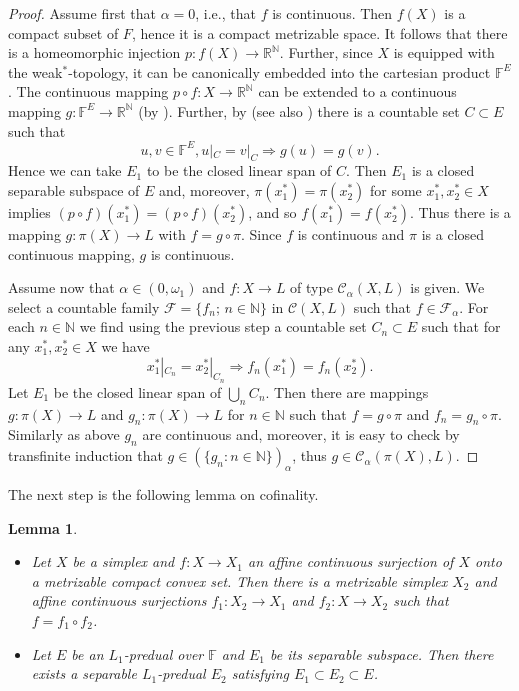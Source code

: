 \documentclass{amsart}
\numberwithin{equation}{section}
\newtheorem{lemma}[thm]{Lemma}
\theoremstyle{definition}
\def\C{\mathcal C}
\def\F{\mathcal F}
\def\en{\mathbb N}
\def\ef{\mathbb F}
\def\er{\mathbb R}
\def\r{|}
\newcommand{\setsep}{;\,}
\begin{document}
\begin{proof}
Assume first that $\alpha=0$, i.e., that $f$ is continuous. Then $f(X)$ is a compact subset of $F$, hence it is a compact metrizable space. It follows that there is a homeomorphic injection $p\colon f(X)\to\er^\en$. Further, since $X$ is equipped with the weak$^*$-topology, it can be canonically embedded into the cartesian product $\ef^E$. The continuous mapping $p\circ f\colon X\to\er^\en$ can be extended to a continuous mapping $g\colon\ef^E\to\er^\en$ (by \cite[Theorem 3.1.7]{engelking}). Further, by \cite[Theorem 4]{Ross-Stone} (see also \cite[Problem 2.7.12(d)]{engelking}) there is a countable set $C\subset E$ such that
$$u,v\in \ef^E, u\r_{C}=v\r_{C} \Rightarrow g(u)=g(v).$$
Hence we can take $E_1$ to be the closed linear span of $C$. Then $E_1$ is a closed separable subspace of $E$ and, moreover,
$\pi(x_1^*)=\pi(x_2^*)$ for some $x_1^*,x_2^*\in X$ implies $(p\circ f)(x_1^*)=(p\circ f)(x_2^*)$, and so $f(x_1^*)=f(x_2^*)$. Thus there is a mapping $g:\pi(X)\to L$ with $f=g\circ\pi$. Since $f$ is continuous and $\pi$ is a closed continuous mapping, $g$ is continuous.

Assume now that $\alpha\in (0,\omega_1)$ and $f\colon X\to L$ of type $\C_\alpha(X,L)$ is given. We select a countable family $\F=\{f_n\setsep n\in\en\}$ in $\C(X,L)$ such that $f\in \F_\alpha$.
For each $n\in\en$ we find using the previous step a countable set $C_n\subset E$ such that for any $x_1^*,x_2^*\in X$ we have
$$x_1^*\r_{C_n}=x_2^*\r_{C_n}\Rightarrow f_n(x_1^*)=f_n(x_2^*).$$
Let $E_1$ be the closed linear span of $\bigcup_n C_n$. Then there are mappings $g:\pi(X)\to L$ and $g_n:\pi(X)\to L$ for $n\in\en$
such that $f=g\circ\pi$ and $f_n=g_n\circ\pi$. Similarly as above $g_n$ are continuous and, moreover, it is easy to check by transfinite induction
that $g\in\left(\{g_n:n\in\en\}\right)_\alpha$, thus $g\in\C_\alpha(\pi(X),L)$.
\end{proof}

The next step is the following lemma on cofinality.

\begin{lemma}
\label{L:rich} \
\begin{itemize}
\item[(S)] Let $X$ be a simplex and $f:X\to X_1$ an affine continuous surjection of $X$ onto a metrizable compact convex set. Then there is a metrizable simplex $X_2$ and affine continuous surjections $f_1:X_2\to X_1$ and $f_2:X\to X_2$ such that $f=f_1\circ f_2$.
	\item[(R,C)] Let $E$ be an $L_1$-predual over $\ef$ and $E_1$ be its separable subspace. Then there exists a separable $L_1$-predual $E_2$ satisfying $E_1\subset E_2\subset E$.
\end{itemize}
\end{lemma}
\end{document}

